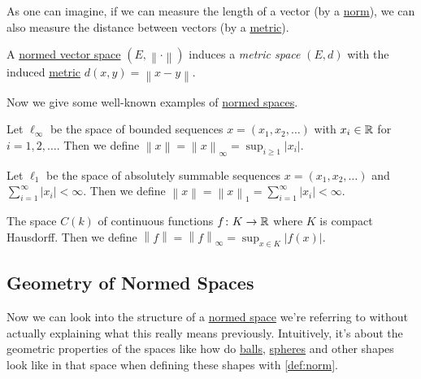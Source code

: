As one can imagine, if we can measure the length of a vector (by a \hyperref[def:norm]{norm}), we can also measure the distance between vectors (by a \hyperref[def:metric]{metric}).

\begin{remark}
	A \hyperref[def:normed-vector-space]{normed vector space} \((E, \left\lVert \cdot\right\rVert )\) induces a \emph{metric space} \((E, d)\) with the induced \hyperref[def:metric]{metric} \(d(x, y) = \left\lVert x- y\right\rVert \).
\end{remark}

Now we give some well-known examples of \hyperref[def:normed-vector-space]{normed spaces}.

\begin{eg}
	Let \(\ell _\infty \) be the space of bounded sequences \(x = (x_1, x_2, \ldots )\) with \(x_i\in \mathbb{\MakeUppercase{r}} \) for \(i = 1, 2, \ldots \). Then we define \(\left\lVert x\right\rVert = \left\lVert x\right\rVert _\infty = \sup _{i \geq 1}\left\vert x_i \right\vert \).
\end{eg}

\begin{eg}
	Let \(\ell _1\) be the space of absolutely summable sequences \(x = (x_1, x_2, \ldots)\) and \(\sum_{i=1}^{\infty} \left\vert x_i \right\vert < \infty\). Then we define \(\left\lVert x\right\rVert = \left\lVert x\right\rVert _1 = \sum_{i=1}^{\infty} \left\vert x_i \right\vert < \infty\).
\end{eg}

\begin{eg}
	The space \(C(k)\) of continuous functions \(f\colon K\to \mathbb{\MakeUppercase{r}} \) where \(K\) is compact Hausdorff. Then we define \(\left\lVert f\right\rVert = \left\lVert f\right\rVert _\infty = \sup _{x\in K}\left\vert f(x) \right\vert \).
\end{eg}

\subsection{Geometry of Normed Spaces}
Now we can look into the structure of a \hyperref[def:normed-vector-space]{normed space} we're referring to without actually explaining what this really means previously. Intuitively, it's about the geometric properties of the spaces like how do \hyperref[def:ball]{balls}, \hyperref[def:sphere]{spheres} and other shapes look like in that space when defining these shapes with \autoref{def:norm}.

